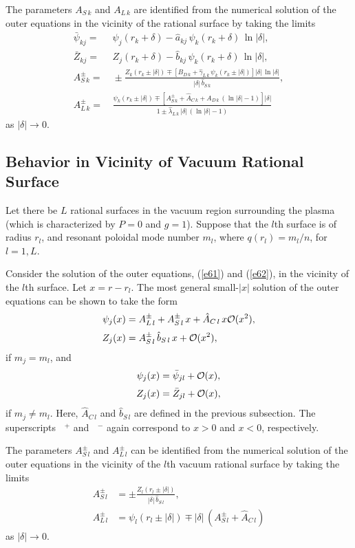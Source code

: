 \documentclass[12pt,prb,aps,notitlepage]{revtex4-1}
\begin{document}
The parameters $A_{S\,k}$ and $A_{L\,k}$ are identified from the numerical solution of the outer equations in the
vicinity of the  rational surface 
by taking the limits
\begin{align}
\bar{\psi}_{kj} =&\, \psi_{j}(r_k+\delta) - \hat{a}_{kj}\,\psi_k(r_k+\delta)\,\ln |\delta|,\\[0.5ex]
\bar{Z}_{kj}=&\, Z_{j}(r_k+\delta) - \hat{b}_{kj}\,\psi_k(r_k+\delta)\,\ln|\delta|,\\[0.5ex]
A_{S\,k}^\pm =&\, \pm\frac{Z_k(r_k\pm|\delta|) \mp \left[B_{D\,k}+\hat{\gamma}_{L\,k}\,\psi_k(r_k\pm |\delta|)\right]
|\delta|\,\ln |\delta|}{|\delta|\,\hat{b}_{S\,k}},\\[0.5ex]
A_{L\,k}^\pm =&\, \frac{\psi_k(r_k\pm|\delta|)\mp \left[A_{S\,k}^\pm +\hat{A}_{C\,k}+ A_{D\,k}\,(\ln |\delta|-1)\right]|\delta|}{1\pm \hat{\lambda}_{L\,k}\,|\delta|\,(\ln |\delta|-1)}
\end{align}
as $|\delta|\rightarrow 0$.

\subsection{Behavior in Vicinity of Vacuum Rational Surface}
Let there be $L$ rational surfaces in the vacuum region surrounding the plasma (which is characterized by $P=0$ and $g=1$). Suppose that the $l$th surface is of radius $r_l$, and resonant
poloidal mode number $m_l$, where $q(r_l)=m_l/n$, for $l=1,L$.

Consider the solution of the outer equations, (\ref{e61}) and (\ref{e62}), in the
vicinity of the $l$th surface. Let  $x=r-r_l$.  The most general small-$|x|$ solution of the outer equations
can be shown to take the form
\begin{align}
\psi_j(x)&= A_{L\,l}^\pm+ A_{S\,l}^{\pm}\,x + \hat{A}_{C\,l}\,x{\cal O}(x^2),\\[0.5ex]
Z_j(x) &= A_{S\,l}^\pm\,\hat{b}_{S\,l}\,x + {\cal O}(x^2),
\end{align}
if $m_j=m_l$, and
\begin{align}
\psi_{j}(x) &= \bar{\psi}_{jl} + {\cal O}(x),\\[0.5ex]
Z_{j}(x) &= \bar{Z}_{jl}+{\cal O}(x),
\end{align}
if $m_j\neq m_l$.
Here, $\hat{A}_{C\,l}$ and $\hat{b}_{S\,l}$ are defined in the previous subsection. 
The superscripts $\phantom{x}^+$ and $\phantom{x}^-$ again correspond  to $x>0$ and $x<0$, respectively. 

The parameters $A_{S\,l}^\pm$ and $A_{L\,l}^\pm$ can be identified from the numerical solution of the outer
equations in the vicinity of the $l$th vacuum rational surface by taking the limits
\begin{align}
A_{S\,l}^{\pm} &= \pm \frac{Z_l(r_l\pm|\delta|)}{|\delta|\,\hat{b}_{S\,l}},\\[0.5ex]
A_{L\,l}^{\pm} &= \psi_l(r_l\pm|\delta|) \mp |\delta|\,(A_{S\,l}^\pm+\hat{A}_{C\,l})
\end{align}
as $|\delta|\rightarrow 0$. 
\end{document}
